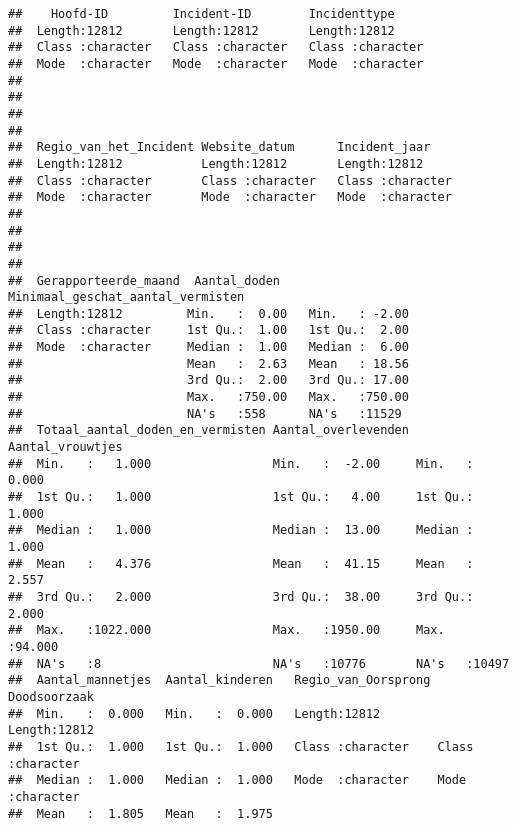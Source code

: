 \documentclass[
]{article}
\begin{document}
\begin{verbatim}
##    Hoofd-ID         Incident-ID        Incidenttype      
##  Length:12812       Length:12812       Length:12812      
##  Class :character   Class :character   Class :character  
##  Mode  :character   Mode  :character   Mode  :character  
##                                                          
##                                                          
##                                                          
##                                                          
##  Regio_van_het_Incident Website_datum      Incident_jaar     
##  Length:12812           Length:12812       Length:12812      
##  Class :character       Class :character   Class :character  
##  Mode  :character       Mode  :character   Mode  :character  
##                                                              
##                                                              
##                                                              
##                                                              
##  Gerapporteerde_maand  Aantal_doden    Minimaal_geschat_aantal_vermisten
##  Length:12812         Min.   :  0.00   Min.   : -2.00                   
##  Class :character     1st Qu.:  1.00   1st Qu.:  2.00                   
##  Mode  :character     Median :  1.00   Median :  6.00                   
##                       Mean   :  2.63   Mean   : 18.56                   
##                       3rd Qu.:  2.00   3rd Qu.: 17.00                   
##                       Max.   :750.00   Max.   :750.00                   
##                       NA's   :558      NA's   :11529                    
##  Totaal_aantal_doden_en_vermisten Aantal_overlevenden Aantal_vrouwtjes
##  Min.   :   1.000                 Min.   :  -2.00     Min.   : 0.000  
##  1st Qu.:   1.000                 1st Qu.:   4.00     1st Qu.: 1.000  
##  Median :   1.000                 Median :  13.00     Median : 1.000  
##  Mean   :   4.376                 Mean   :  41.15     Mean   : 2.557  
##  3rd Qu.:   2.000                 3rd Qu.:  38.00     3rd Qu.: 2.000  
##  Max.   :1022.000                 Max.   :1950.00     Max.   :94.000  
##  NA's   :8                        NA's   :10776       NA's   :10497   
##  Aantal_mannetjes  Aantal_kinderen   Regio_van_Oorsprong Doodsoorzaak      
##  Min.   :  0.000   Min.   :  0.000   Length:12812        Length:12812      
##  1st Qu.:  1.000   1st Qu.:  1.000   Class :character    Class :character  
##  Median :  1.000   Median :  1.000   Mode  :character    Mode  :character  
##  Mean   :  1.805   Mean   :  1.975                                         

\end{verbatim}
\end{document}

